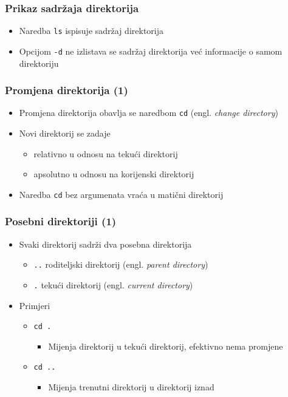 \documentclass{beamer}
\begin{document}
\begin{frame}[t]
\frametitle{Prikaz sadržaja direktorija}
\begin{itemize}
  \item Naredba \texttt{ls} ispisuje sadržaj direktorija
  \item Opcijom \texttt{-d} ne izlistava se sadržaj direktorija već 
        informacije o samom direktoriju
\end{itemize}
\end{frame}
    

\begin{frame}[t]
\frametitle{Promjena direktorija (1)}
\begin{itemize}
  \item Promjena direktorija obavlja se naredbom \texttt{cd} (engl. 
        \emph{change directory})
  \item Novi direktorij se zadaje 
  \begin{itemize}
    \item relativno u odnosu na tekući direktorij
    \item apsolutno u odnosu na korijenski direktorij  
  \end{itemize}
  \item Naredba \texttt{cd} bez argumenata vraća u matični direktorij
\end{itemize}
\end{frame}

\begin{frame}[t]
\frametitle{Posebni direktoriji (1)}
\begin{itemize}
  \item Svaki direktorij sadrži dva posebna direktorija
  \begin{itemize}
    \item \texttt{..} roditeljski direktorij (engl. \emph{parent directory})
    \item \texttt{.} tekući direktorij (engl. \emph{current directory})
  \end{itemize}
  \item Primjeri
  \begin{itemize}
    \item \texttt{cd . } 
    \begin{itemize}
      \item Mijenja direktorij u tekući direktorij, efektivno nema 
               promjene
    \end{itemize}
    \item \texttt{cd .. }
    \begin{itemize}
      \item Mijenja trenutni direktorij u direktorij iznad
    \end{itemize}
  \end{itemize}
\end{itemize}
\end{frame}
\end{document}
